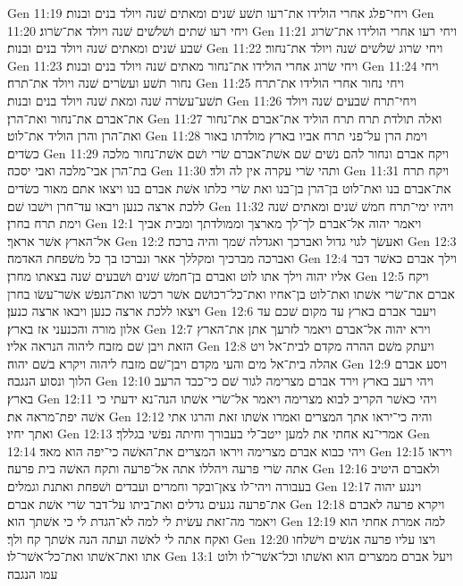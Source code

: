 Gen 11:19  ויחי־פלג אחרי הולידו את־רעו תשׁע שׁנים ומאתים שׁנה ויולד בנים ובנות׃
Gen 11:20  ויחי רעו שׁתים ושׁלשׁים שׁנה ויולד את־שׂרוג׃
Gen 11:21  ויחי רעו אחרי הולידו את־שׂרוג שׁבע שׁנים ומאתים שׁנה ויולד בנים ובנות׃
Gen 11:22  ויחי שׂרוג שׁלשׁים שׁנה ויולד את־נחור׃
Gen 11:23  ויחי שׂרוג אחרי הולידו את־נחור מאתים שׁנה ויולד בנים ובנות׃
Gen 11:24  ויחי נחור תשׁע ועשׂרים שׁנה ויולד את־תרח׃
Gen 11:25  ויחי נחור אחרי הולידו את־תרח תשׁע־עשׂרה שׁנה ומאת שׁנה ויולד בנים ובנות׃
Gen 11:26  ויחי־תרח שׁבעים שׁנה ויולד את־אברם את־נחור ואת־הרן׃
Gen 11:27  ואלה תולדת תרח תרח הוליד את־אברם את־נחור ואת־הרן והרן הוליד את־לוט׃
Gen 11:28  וימת הרן על־פני תרח אביו בארץ מולדתו באור כשׂדים׃
Gen 11:29  ויקח אברם ונחור להם נשׁים שׁם אשׁת־אברם שׂרי ושׁם אשׁת־נחור מלכה בת־הרן אבי־מלכה ואבי יסכה׃
Gen 11:30  ותהי שׂרי עקרה אין לה ולד׃
Gen 11:31  ויקח תרח את־אברם בנו ואת־לוט בן־הרן בן־בנו ואת שׂרי כלתו אשׁת אברם בנו ויצאו אתם מאור כשׂדים ללכת ארצה כנען ויבאו עד־חרן וישׁבו שׁם׃
Gen 11:32  ויהיו ימי־תרח חמשׁ שׁנים ומאתים שׁנה וימת תרח בחרן׃
Gen 12:1  ויאמר יהוה אל־אברם לך־לך מארצך וממולדתך ומבית אביך אל־הארץ אשׁר אראך׃
Gen 12:2  ואעשׂך לגוי גדול ואברכך ואגדלה שׁמך והיה ברכה׃
Gen 12:3  ואברכה מברכיך ומקללך אאר ונברכו בך כל משׁפחת האדמה׃
Gen 12:4  וילך אברם כאשׁר דבר אליו יהוה וילך אתו לוט ואברם בן־חמשׁ שׁנים ושׁבעים שׁנה בצאתו מחרן׃
Gen 12:5  ויקח אברם את־שׂרי אשׁתו ואת־לוט בן־אחיו ואת־כל־רכושׁם אשׁר רכשׁו ואת־הנפשׁ אשׁר־עשׂו בחרן ויצאו ללכת ארצה כנען ויבאו ארצה כנען׃
Gen 12:6  ויעבר אברם בארץ עד מקום שׁכם עד אלון מורה והכנעני אז בארץ׃
Gen 12:7  וירא יהוה אל־אברם ויאמר לזרעך אתן את־הארץ הזאת ויבן שׁם מזבח ליהוה הנראה אליו׃
Gen 12:8  ויעתק משׁם ההרה מקדם לבית־אל ויט אהלה בית־אל מים והעי מקדם ויבן־שׁם מזבח ליהוה ויקרא בשׁם יהוה׃
Gen 12:9  ויסע אברם הלוך ונסוע הנגבה׃
Gen 12:10  ויהי רעב בארץ וירד אברם מצרימה לגור שׁם כי־כבד הרעב בארץ׃
Gen 12:11  ויהי כאשׁר הקריב לבוא מצרימה ויאמר אל־שׂרי אשׁתו הנה־נא ידעתי כי אשׁה יפת־מראה את׃
Gen 12:12  והיה כי־יראו אתך המצרים ואמרו אשׁתו זאת והרגו אתי ואתך יחיו׃
Gen 12:13  אמרי־נא אחתי את למען ייטב־לי בעבורך וחיתה נפשׁי בגללך׃
Gen 12:14  ויהי כבוא אברם מצרימה ויראו המצרים את־האשׁה כי־יפה הוא מאד׃
Gen 12:15  ויראו אתה שׂרי פרעה ויהללו אתה אל־פרעה ותקח האשׁה בית פרעה׃
Gen 12:16  ולאברם היטיב בעבורה ויהי־לו צאן־ובקר וחמרים ועבדים ושׁפחת ואתנת וגמלים׃
Gen 12:17  וינגע יהוה את־פרעה נגעים גדלים ואת־ביתו על־דבר שׂרי אשׁת אברם׃
Gen 12:18  ויקרא פרעה לאברם ויאמר מה־זאת עשׂית לי למה לא־הגדת לי כי אשׁתך הוא׃
Gen 12:19  למה אמרת אחתי הוא ואקח אתה לי לאשׁה ועתה הנה אשׁתך קח ולך׃
Gen 12:20  ויצו עליו פרעה אנשׁים וישׁלחו אתו ואת־אשׁתו ואת־כל־אשׁר־לו׃
Gen 13:1  ויעל אברם ממצרים הוא ואשׁתו וכל־אשׁר־לו ולוט עמו הנגבה׃
